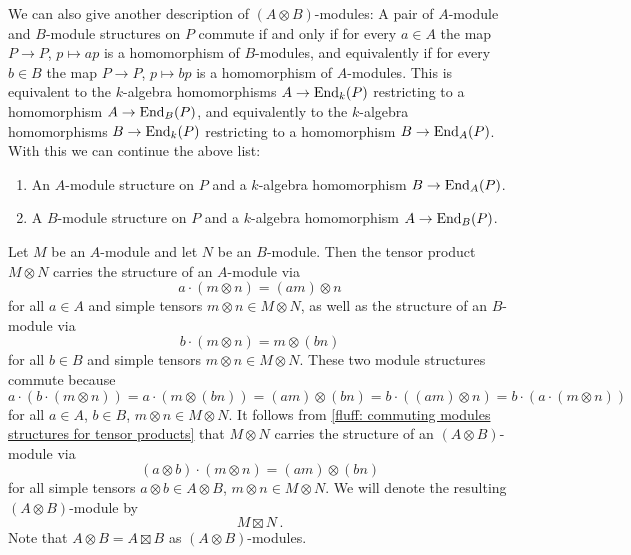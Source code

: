 \begin{fluff}
  We can also give another description of $(A \otimes B)$-modules:
  A pair of $A$-module and $B$-module structures on $P$ commute if and only if for every $a \in A$ the map $P \to P$, $p \mapsto ap$ is a homomorphism of $B$-modules, and equivalently if for every $b \in B$ the map $P \to P$, $p \mapsto bp$ is a homomorphism of $A$-modules.
  This is equivalent to the $k$-algebra homomorphisms $A \to \operatorname{End}_k(P)$ restricting to a homomorphism $A \to \operatorname{End}_B(P)$, and equivalently to the $k$-algebra homomorphisms $B \to \operatorname{End}_k(P)$ restricting to a homomorphism $B \to \operatorname{End}_A(P)$.
  With this we can continue the above list:
  \begin{enumerate}[resume]
    \item
      An $A$-module structure on $P$ and a $k$-algebra homomorphism $B \to \operatorname{End}_A(P)$.
    \item
      A $B$-module structure on $P$ and a $k$-algebra homomorphism $A \to \operatorname{End}_B(P)$.
  \end{enumerate}
\end{fluff}


\begin{fluff}
  \label{fluff: construction of boxtimes}
  Let $M$ be an $A$-module and let $N$ be an $B$-module.
  Then the tensor product $M \otimes N$ carries the structure of an $A$-module via
  \[
      a \cdot (m \otimes n)
    = (am) \otimes n
  \]
  for all $a \in A$ and simple tensors $m \otimes n \in M \otimes N$, as well as the structure of an $B$-module via
  \[
      b \cdot (m \otimes n)
    = m \otimes (bn)
  \]
  for all $b \in B$ and simple tensors $m \otimes n \in M \otimes N$.
  These two module structures commute because
  \[
      a \cdot (b \cdot (m \otimes n))
    = a \cdot (m \otimes (bn))
    = (am) \otimes (bn)
    = b \cdot ((am) \otimes n)
    = b \cdot (a \cdot (m \otimes n))
  \]
  for all $a \in A$, $b \in B$, $m \otimes n \in M \otimes N$.
  It follows from \ref{fluff: commuting modules structures for tensor products} that $M \otimes N$ carries the structure of an $(A \otimes B)$-module via
  \[
      (a \otimes b) \cdot (m \otimes n)
    = (am) \otimes (bn)
  \]
  for all simple tensors $a \otimes b \in A \otimes B$, $m \otimes n \in M \otimes N$.
  We will denote the resulting $(A \otimes B)$-module by
  \[
    M \mathbin{\boxtimes} N \,.
  \]
  Note that $A \otimes B = A \mathbin{\boxtimes} B$ as $(A \otimes B)$-modules.
\end{fluff}



